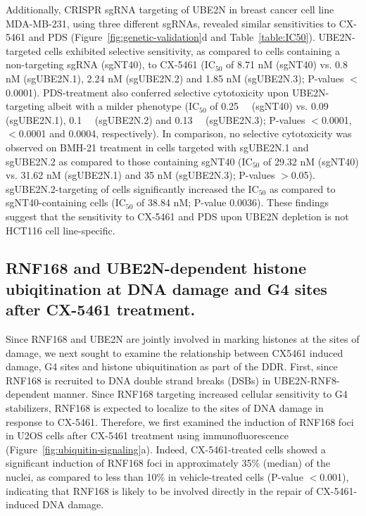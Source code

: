 Additionally, CRISPR sgRNA targeting of UBE2N in breast cancer cell line MDA-MB-231, using three different sgRNAs, revealed similar sensitivities to CX-5461 and PDS (Figure~\ref{fig:genetic-validation}d and Table~\ref{table:IC50}). UBE2N-targeted cells exhibited selective sensitivity, as compared to cells containing a non-targeting sgRNA (sgNT40), to CX-5461 (IC$_{50}$ of 8.71 nM (sgNT40) vs. 0.8 nM (sgUBE2N.1), 2.24 nM (sgUBE2N.2) and 1.85 nM (sgUBE2N.3); P-values $<$0.0001). 
PDS-treatment also conferred selective cytotoxicity upon UBE2N-targeting albeit with a milder phenotype (IC$_{50}$ of \SI{0.25}{\micro\Molar} (sgNT40) vs. \SI{0.09}{\micro\Molar} (sgUBE2N.1), \SI{0.1}{\micro\Molar} (sgUBE2N.2) and \SI{0.13}{\micro\Molar} (sgUBE2N.3); P-values $<$0.0001, $<$0.0001 and 0.0004, respectively). 
In comparison, no selective cytotoxicity was observed on BMH-21 treatment in cells targeted with sgUBE2N.1 and sgUBE2N.2 as compared to those containing sgNT40 (IC$_{50}$ of 29.32 nM (sgNT40) vs. 31.62 nM (sgUBE2N.1) and 35 nM (sgUBE2N.3); P-values $>$0.05). 
sgUBE2N.2-targeting of cells significantly increased the IC$_{50}$ as compared to sgNT40-containing cells (IC$_{50}$ of 38.84 nM; P-value 0.0036). 
These findings suggest that the sensitivity to CX-5461 and PDS upon UBE2N depletion is not HCT116 cell line-specific. 

\subsection{RNF168 and UBE2N-dependent histone ubiqitination at DNA damage and G4 sites after CX-5461 treatment.}

Since RNF168 and UBE2N are jointly involved in marking histones at the sites of damage, we next sought to examine the relationship between CX5461 induced damage, G4 sites and histone ubiquitination as part of the DDR.
First, since RNF168 is recruited to DNA double strand breaks (DSBs) in UBE2N-RNF8-dependent manner. 
Since RNF168 targeting increased cellular sensitivity to G4 stabilizers, RNF168 is expected to localize to the sites of DNA damage in response to CX-5461. 
Therefore, we first examined the induction of RNF168 foci in U2OS cells after CX-5461 treatment using immunofluorescence (Figure~\ref{fig:ubiquitin-signaling}a). 
Indeed, CX-5461-treated cells showed a significant induction of RNF168 foci in approximately 35\% (median) of the nuclei, as compared to less than 10\% in vehicle-treated cells (P-value $<$0.001), indicating that RNF168 is likely to be involved directly in the repair of CX-5461-induced DNA damage.

